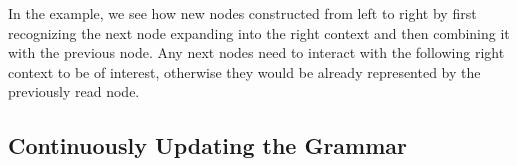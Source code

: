%
\noindent
In the example, we see how new nodes constructed from left to right by first recognizing the next node expanding into the right context and then combining it with the previous node. Any next nodes need to interact with the following right context to be of interest, otherwise they would be already represented by the previously read node.

\subsection{Continuously Updating the Grammar}

